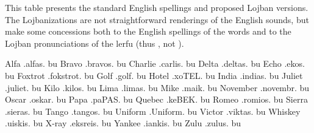 This table presents the standard English spellings and
    proposed Lojban versions. The Lojbanizations are not
    straightforward renderings of the English sounds, but make some
    concessions both to the English spellings of the words and to
    the Lojban pronunciations of the lerfu (thus ,
    not ).

   Alfa        .alfas. bu
    Bravo       .bravos. bu
    Charlie     .carlis. bu
    Delta       .deltas. bu
    Echo        .ekos. bu
    Foxtrot     .fokstrot. bu
    Golf        .golf. bu
    Hotel       .xoTEL. bu
    India       .indias. bu
    Juliet      .juliet. bu
    Kilo        .kilos. bu
    Lima        .limas. bu
    Mike        .maik. bu
    November    .novembr. bu
    Oscar       .oskar. bu
    Papa        .paPAS. bu
    Quebec      .keBEK. bu
    Romeo       .romios. bu
    Sierra      .sieras. bu
    Tango       .tangos. bu
    Uniform     .Uniform. bu
    Victor      .viktas. bu
    Whiskey     .uiskis. bu
    X-ray       .eksreis. bu
    Yankee      .iankis. bu
    Zulu        .zulus. bu
